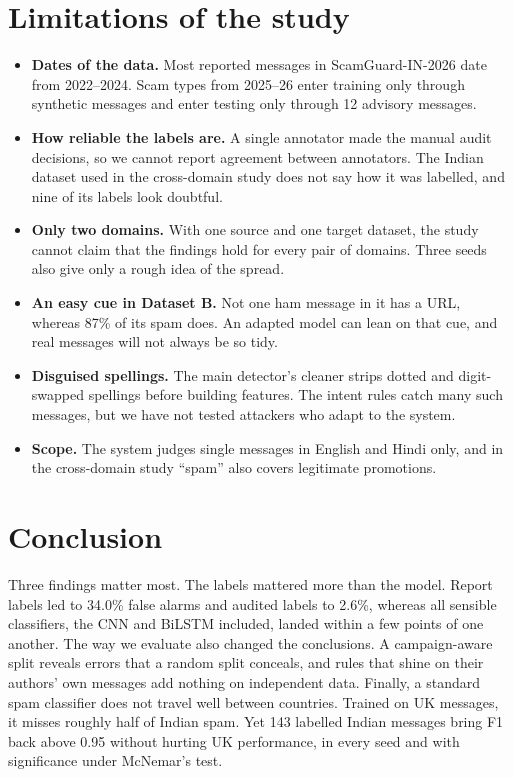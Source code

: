 \section{Limitations of the study}
\begin{itemize}
\item \textbf{Dates of the data.} Most reported messages in ScamGuard-IN-2026 date from 2022--2024. Scam types from 2025--26 enter training only through synthetic messages and enter testing only through 12 advisory messages.
\item \textbf{How reliable the labels are.} A single annotator made the manual audit decisions, so we cannot report agreement between annotators. The Indian dataset used in the cross-domain study does not say how it was labelled, and nine of its labels look doubtful.
\item \textbf{Only two domains.} With one source and one target dataset, the study cannot claim that the findings hold for every pair of domains. Three seeds also give only a rough idea of the spread.
\item \textbf{An easy cue in Dataset B.} Not one ham message in it has a URL, whereas 87\% of its spam does. An adapted model can lean on that cue, and real messages will not always be so tidy.
\item \textbf{Disguised spellings.} The main detector's cleaner strips dotted and digit-swapped spellings before building features. The intent rules catch many such messages, but we have not tested attackers who adapt to the system.
\item \textbf{Scope.} The system judges single messages in English and Hindi only, and in the cross-domain study ``spam'' also covers legitimate promotions.
\end{itemize}

\section{Conclusion}
Three findings matter most. The labels mattered more than the model. Report labels led to 34.0\% false alarms and audited labels to 2.6\%, whereas all sensible classifiers, the CNN and BiLSTM included, landed within a few points of one another. The way we evaluate also changed the conclusions. A campaign-aware split reveals errors that a random split conceals, and rules that shine on their authors' own messages add nothing on independent data. Finally, a standard spam classifier does not travel well between countries. Trained on UK messages, it misses roughly half of Indian spam. Yet 143 labelled Indian messages bring F1 back above 0.95 without hurting UK performance, in every seed and with significance under McNemar's test.

